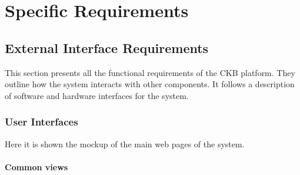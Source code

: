 \chapter{Specific Requirements}

\section{External Interface Requirements}
This section presents all the functional requirements of the CKB platform.
They outline how the system interacts with other components.
It follows a description of software and hardware interfaces for the system.

\subsection{User Interfaces}


Here it is shown the mockup of the main web pages of the system.

\captionsetup[figure]{skip=0pt}
\subsubsection*{Common views}

